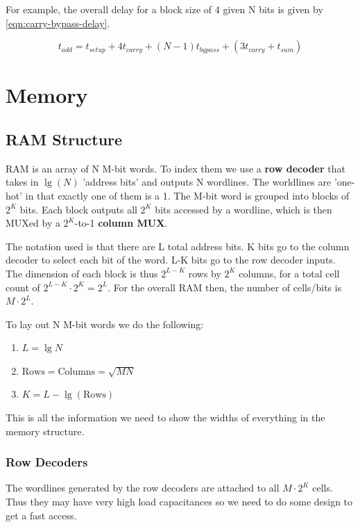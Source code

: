\documentclass[11pt]{report}
\begin{document}
For example, the overall delay for a block size of 4 given N bits is given by \autoref{eqn:carry-bypass-delay}.

\begin{equation}
	\label{eqn:carry-bypass-delay}
	t_{add} = t_{setup} + 4t_{carry} + (N-1)t_{bypass} + (3t_{carry} + t_{sum})
\end{equation}


\chapter{Memory}

\section{RAM Structure}
RAM is an array of N M-bit words. To index them we use a \textbf{row decoder} that takes in $\lg(N)$ 'address bits' and outputs N wordlines. The worldlines are 'one-hot' in that exactly one of them is a 1. The M-bit word is grouped into blocks of $2^K$ bits. Each block outputs all $2^K$ bits accessed by a wordline, which is then MUXed by a $2^K$-to-1 \textbf{column MUX}.

The notation used is that there are L total address bits. K bits go to the column decoder to select each bit of the word. L-K bits go to the row decoder inputs. The dimension of each block is thus $2^{L-K}$ rows by $2^{K}$ columns, for a total cell count of $2^{L-K} \cdot 2^{K} = 2^{L}$. For the overall RAM then, the number of cells/bits is $M\cdot2^{L}$.

To lay out N M-bit words we do the following:
\begin{enumerate}
	\item $L = \lg{N}$
	\item $\text{Rows} = \text{Columns} = \sqrt{MN}$
	\item $K = L - \lg(\text{Rows})$
\end{enumerate}

This is all the information we need to show the widths of everything in the memory structure.

\subsection{Row Decoders}

The wordlines generated by the row decoders are attached to all $M \cdot 2^K$ cells. Thus they may have very high load capacitances so we need to do some design to get a fast access.
\end{document}
